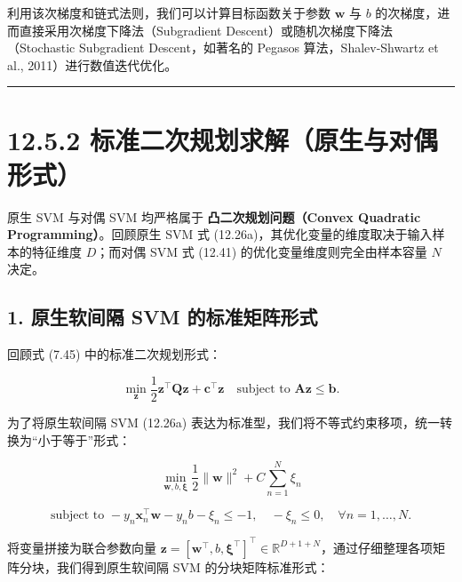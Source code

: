 利用该次梯度和链式法则，我们可以计算目标函数关于参数 $ \boldsymbol{w} $ 与 $ b $ 的次梯度，进而直接采用次梯度下降法（Subgradient Descent）或随机次梯度下降法（Stochastic Subgradient Descent，如著名的 Pegasos 算法，Shalev-Shwartz et al., 2011）进行数值迭代优化。

\medskip\hrule\medskip

\section*{12.5.2 标准二次规划求解（原生与对偶形式）}

原生 SVM 与对偶 SVM 均严格属于 \textbf{凸二次规划问题（Convex Quadratic Programming）}。回顾原生 SVM 式 (12.26a)，其优化变量的维度取决于输入样本的特征维度 $ D $；而对偶 SVM 式 (12.41) 的优化变量维度则完全由样本容量 $ N $ 决定。

\subsection*{1. 原生软间隔 SVM 的标准矩阵形式}

回顾式 (7.45) 中的标准二次规划形式：

\begin{equation*}
\min_{\boldsymbol{z}} \frac{1}{2} \boldsymbol{z}^\top \boldsymbol{Q} \boldsymbol{z} + \boldsymbol{c}^\top \boldsymbol{z} \quad \text{subject to } \boldsymbol{A} \boldsymbol{z} \leqslant \boldsymbol{b} .
\end{equation*}

为了将原生软间隔 SVM (12.26a) 表达为标准型，我们将不等式约束移项，统一转换为“小于等于”形式：

\begin{equation}
\min_{\boldsymbol{w}, b, \boldsymbol{\xi}} \frac{1}{2} \|\boldsymbol{w}\|^2 + C \sum_{n=1}^N \xi_n
\tag{12.55}
\end{equation}

\begin{equation*}
\text{subject to } - y_n \boldsymbol{x}_n^\top \boldsymbol{w} - y_n b - \xi_n \leqslant -1 , \quad -\xi_n \leqslant 0 , \quad \forall n = 1, \ldots, N .
\end{equation*}

将变量拼接为联合参数向量 $ \boldsymbol{z} = [\boldsymbol{w}^\top, b, \boldsymbol{\xi}^\top]^\top \in \mathbb{R}^{D + 1 + N} $，通过仔细整理各项矩阵分块，我们得到原生软间隔 SVM 的分块矩阵标准形式：

